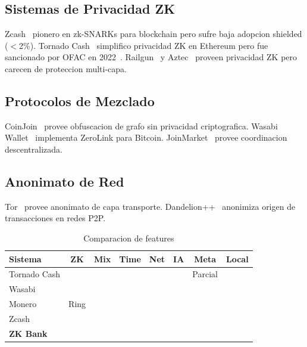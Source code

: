\documentclass[11pt]{article}
\newcommand{\cmark}{\ding{51}}
\newcommand{\xmark}{\ding{55}}
\theoremstyle{definition}
\theoremstyle{plain}
\theoremstyle{remark}
\begin{document}
\subsection{Sistemas de Privacidad ZK}

Zcash~\cite{hopwood2016zcash} pionero en zk-SNARKs para blockchain pero sufre baja adopcion shielded ($<$2\%). Tornado Cash~\cite{pertsev2019tornado} simplifico privacidad ZK en Ethereum pero fue sancionado por OFAC en 2022~\cite{ofac2022tornado}. Railgun~\cite{railgun2021} y Aztec~\cite{aztec2023} proveen privacidad ZK pero carecen de proteccion multi-capa.

\subsection{Protocolos de Mezclado}

CoinJoin~\cite{maxwell2013coinjoin} provee obfuscacion de grafo sin privacidad criptografica. Wasabi Wallet~\cite{nopara2018wasabi} implementa ZeroLink para Bitcoin. JoinMarket~\cite{joinmarket2015} provee coordinacion descentralizada.

\subsection{Anonimato de Red}

Tor~\cite{dingledine2004tor} provee anonimato de capa transporte. Dandelion++~\cite{venkatakrishnan2017dandelion} anonimiza origen de transacciones en redes P2P.

\begin{table}[H]
\centering
\caption{Comparacion de features}
\label{tab:related}
\begin{tabular}{lccccccc}
\toprule
\textbf{Sistema} & \textbf{ZK} & \textbf{Mix} & \textbf{Time} & \textbf{Net} & \textbf{IA} & \textbf{Meta} & \textbf{Local} \\
\midrule
Tornado Cash & \cmark & \xmark & \xmark & \xmark & \xmark & Parcial & \xmark \\
Wasabi & \xmark & \cmark & \xmark & \cmark & \xmark & \xmark & \xmark \\
Monero & Ring & \cmark & \xmark & \xmark & \xmark & \cmark & \xmark \\
Zcash & \cmark & \xmark & \xmark & \xmark & \xmark & \xmark & \xmark \\
\textbf{ZK Bank} & \cmark & \cmark & \cmark & \cmark & \cmark & \cmark & \cmark \\
\bottomrule
\end{tabular}
\end{table}
\end{document}
